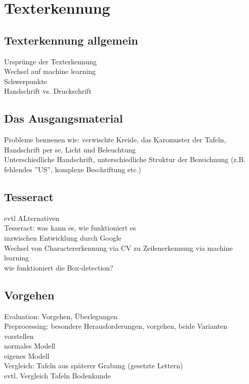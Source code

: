 \section{Texterkennung}
\subsection{Texterkennung allgemein}
Ursprünge der Texterkennung\\
Wechsel auf machine learning\\
Schwerpunkte\\
Handschrift vs. Druckschrift\\

\subsection{Das Ausgangsmaterial}
Probleme bennenen wie: verwischte Kreide, das Karomuster der Tafeln, Handschrift per se, Licht und Beleuchtung\\
Unterschiedliche Handschrift, unterschiedliche Struktur der Bezeichnung (z.B. fehlendes ''US'', komplexe Beschriftung etc.)\\

\subsection{Tesseract}

evtl ALternativen\\
Tesseract: was kann es, wie funktioniert es\\
inzwischen Entwicklung durch Google\\
Wechsel von Charactererkennung via CV zu Zeilenerkennung via machine learning\\
wie funktioniert die Box-detection?\\

\subsection{Vorgehen}
Evaluation: Vorgehen, Überlegungen\\
Preprocessing: besondere Herausforderungen, vorgehen, beide Varianten vorstellen\\
normales Modell\\
eigenes Modell\\
Vergleich: Tafeln aus späterer Grabung (gesetzte Lettern)\\
evtl. Vergleich Tafeln Bodenkunde\\